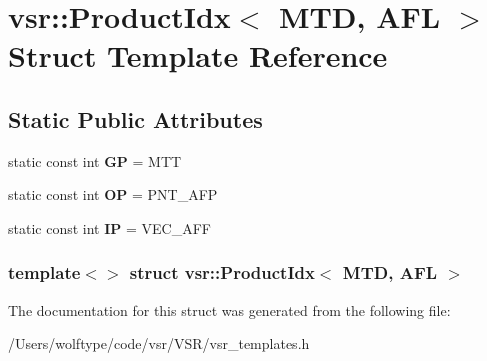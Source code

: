\hypertarget{structvsr_1_1_product_idx_3_01_m_t_d_00_01_a_f_l_01_4}{\section{vsr\-:\-:Product\-Idx$<$ M\-T\-D, A\-F\-L $>$ Struct Template Reference}
\label{structvsr_1_1_product_idx_3_01_m_t_d_00_01_a_f_l_01_4}
}
\subsection*{Static Public Attributes}
\begin{DoxyCompactItemize}
\item 
\hypertarget{structvsr_1_1_product_idx_3_01_m_t_d_00_01_a_f_l_01_4_a0fc76cab5a036fb040f4667984d6a459}{static const int {\bfseries G\-P} = M\-T\-T}\label{structvsr_1_1_product_idx_3_01_m_t_d_00_01_a_f_l_01_4_a0fc76cab5a036fb040f4667984d6a459}

\item 
\hypertarget{structvsr_1_1_product_idx_3_01_m_t_d_00_01_a_f_l_01_4_a9400585b875daf3cc7db9e971a8b52cc}{static const int {\bfseries O\-P} = P\-N\-T\-\_\-\-A\-F\-P}\label{structvsr_1_1_product_idx_3_01_m_t_d_00_01_a_f_l_01_4_a9400585b875daf3cc7db9e971a8b52cc}

\item 
\hypertarget{structvsr_1_1_product_idx_3_01_m_t_d_00_01_a_f_l_01_4_a1aa9320c1bb52733ba9e46619ad6f579}{static const int {\bfseries I\-P} = V\-E\-C\-\_\-\-A\-F\-F}\label{structvsr_1_1_product_idx_3_01_m_t_d_00_01_a_f_l_01_4_a1aa9320c1bb52733ba9e46619ad6f579}

\end{DoxyCompactItemize}
\subsubsection*{template$<$$>$ struct vsr\-::\-Product\-Idx$<$ M\-T\-D, A\-F\-L $>$}



The documentation for this struct was generated from the following file\-:\begin{DoxyCompactItemize}
\item 
/\-Users/wolftype/code/vsr/\-V\-S\-R/vsr\-\_\-templates.\-h\end{DoxyCompactItemize}
